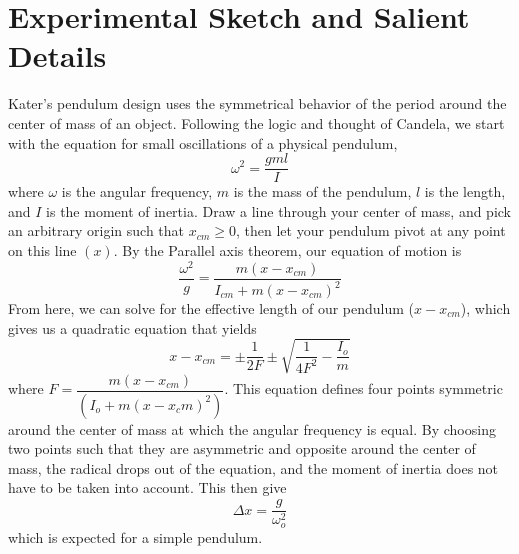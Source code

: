 \section{Experimental Sketch and Salient Details}
Kater's pendulum design uses the symmetrical behavior of the period around the center of mass of an object. Following the logic and thought of Candela\cite{Candela2001}, we start with the equation for small oscillations of a physical pendulum,
\begin{equation}
\omega^2 = \dfrac{gml}{I}
\end{equation}
where $\omega$ is the angular frequency, $m$ is the mass of the pendulum, $l$ is the length, and $I$ is the moment of inertia. Draw a line through your center of mass, and pick an arbitrary origin such that $x_{cm} \geq 0$, then let your pendulum pivot at any point on this line $(x)$. By the Parallel axis theorem, our equation of motion is
\begin{equation}
\dfrac{\omega^2}{g} = \dfrac{m(x-x_{cm})}{I_{cm} +m(x-x_{cm})^2} 
\end{equation}
From here, we can solve for the effective length of our pendulum ($x-x_{cm}$), which gives us a quadratic equation that yields
\begin{equation}
x-x_{cm} = \pm \dfrac 1{2F} \pm \sqrt{\dfrac 1{4F^2} - \dfrac {I_o} {m}} 
\end{equation}
where $F = \dfrac {m(x-x_{cm})}{(I_o + m(x-x_cm)^2)}$. This equation defines four points symmetric around the center of mass at which the angular frequency is equal. By choosing two points such that they are asymmetric and opposite around the center of mass, the radical drops out of the equation, and the moment of inertia does not have to be taken into account. This then give 
\begin{equation}
\Delta x = \dfrac g{\omega_o^2}
\label{Eq:eq1}
\end{equation}
 which is expected for a simple pendulum.

